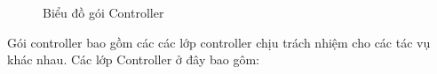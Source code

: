 \documentclass[../DoAn.tex]{subfiles}
\begin{document}
\begin{figure}[H]
    \centering
    \caption{Biểu đồ gói Controller}
    \label{fig:Fig2}
\end{figure}
Gói controller bao gồm các các lớp controller chịu trách nhiệm cho các tác vụ khác nhau. Các lớp Controller ở đây bao gôm:
\end{document}

